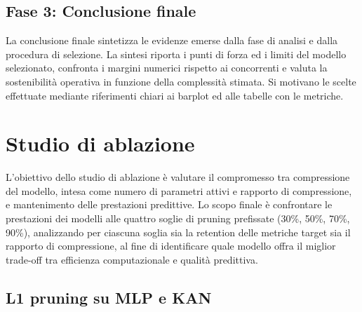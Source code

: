 \documentclass[a4paper,12pt]{report}
\begin{document}
	\subsection{Fase 3: Conclusione finale}
	La conclusione finale sintetizza le evidenze emerse dalla fase di analisi e dalla procedura di selezione. La sintesi riporta i punti di forza ed i limiti del modello selezionato, confronta i margini numerici rispetto ai concorrenti e valuta la sostenibilità operativa in funzione della complessità stimata. Si motivano le scelte effettuate mediante riferimenti chiari ai barplot ed alle tabelle con le metriche.
	
	\section{Studio di ablazione}
	L'obiettivo dello studio di ablazione è valutare il compromesso tra compressione del modello, intesa come numero di parametri attivi e rapporto di compressione, e mantenimento delle prestazioni predittive. Lo scopo finale è confrontare le prestazioni dei modelli alle quattro soglie di pruning prefissate (30\%, 50\%, 70\%, 90\%), analizzando per ciascuna soglia sia la retention delle metriche target sia il rapporto di compressione, al fine di identificare quale modello offra il miglior trade-off tra efficienza computazionale e qualità predittiva.
	
	\subsection{L1 pruning su MLP e KAN}
	
\end{document}
